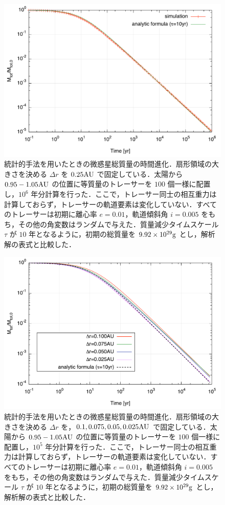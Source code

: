 \documentclass[11pt,a4paper,oneside,onecolumn]{jreport}
\begin{document}
\begin{figure}[H]
 \centering
 \includegraphics[width=12cm]{./image/MassDepletion_NoInteraction_1Myr.pdf}
 \caption{統計的手法を用いたときの微惑星総質量の時間進化．扇形領域の大きさを決める $\Delta r$ を $0.25 {\rm AU}$ で固定している．太陽から $0.95 - 1.05 {\rm AU}$ の位置に等質量のトレーサーを $100$ 個一様に配置し，$10^6$ 年分計算を行った．ここで，トレーサー同士の相互重力は計算しておらず，トレーサーの軌道要素は変化していない．すべてのトレーサーは初期に離心率 $e = 0.01$，軌道傾斜角 $i = 0.005$ をもち，その他の角変数はランダムで与えた．質量減少タイムスケール $\tau$ が $10$ 年となるように，初期の総質量を $9.92 \times 10^{29} {\rm g}$ とし，解析解の表式\cite{3}と比較した．\label{}}
\end{figure}


\begin{figure}[H]
 \centering
 \includegraphics[width=12cm]{./image/MassDepletion_NoInteraction_100kyr.pdf}
 \caption{統計的手法を用いたときの微惑星総質量の時間進化．扇形領域の大きさを決める $\Delta r$ を，$0.1,0.075,0.05,0.025 {\rm AU}$ で固定している．太陽から $0.95 - 1.05 {\rm AU}$ の位置に等質量のトレーサーを $100$ 個一様に配置し，$10^5$ 年分計算を行った．ここで，トレーサー同士の相互重力は計算しておらず，トレーサーの軌道要素は変化していない．すべてのトレーサーは初期に離心率 $e = 0.01$，軌道傾斜角 $i = 0.005$ をもち，その他の角変数はランダムで与えた．質量減少タイムスケール $\tau$ が $10$ 年となるように，初期の総質量を $9.92 \times 10^{29} {\rm g}$ とし，解析解の表式\cite{3}と比較した．\label{}}
\end{figure}
\end{document}
